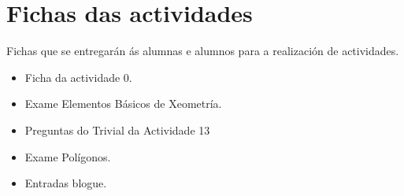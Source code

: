 

\chapter{Fichas das actividades}\label{chap:fich-act}

Fichas que se entregarán ás alumnas e alumnos para a realización de actividades.
\begin{itemize}
  \item Ficha da actividade 0.
  \item Exame Elementos Básicos de Xeometría.
  \item Preguntas do Trivial da Actividade 13
  \item Exame Polígonos.
  \item Entradas blogue.
\end{itemize}
\newpage












